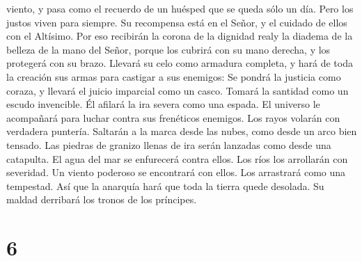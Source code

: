 viento, y pasa como el recuerdo de un huésped que se queda sólo un día.
 Pero los justos viven para siempre. Su recompensa está
en el Señor, y el cuidado de ellos con el Altísimo.  Por
eso recibirán la corona de la dignidad realy la diadema de la belleza de
la mano del Señor, porque los cubrirá con su mano derecha, y los
protegerá con su brazo.  Llevará su celo como armadura
completa, y hará de toda la creación sus armas para castigar a sus
enemigos:  Se pondrá la justicia como coraza, y llevará
el juicio imparcial como un casco.  Tomará la santidad
como un escudo invencible.  Él afilará la ira severa como
una espada. El universo le acompañará para luchar contra sus frenéticos
enemigos.  Los rayos volarán con verdadera puntería.
Saltarán a la marca desde las nubes, como desde un arco bien tensado.
 Las piedras de granizo llenas de ira serán lanzadas como
desde una catapulta. El agua del mar se enfurecerá contra ellos. Los
ríos los arrollarán con severidad.  Un viento poderoso se
encontrará con ellos. Los arrastrará como una tempestad. Así que la
anarquía hará que toda la tierra quede desolada. Su maldad derribará los
tronos de los príncipes.

\hypertarget{section-5}{%
\section{6}\label{section-5}}

